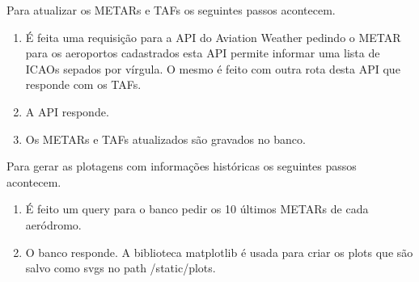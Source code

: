 Para atualizar os METARs e TAFs os seguintes passos acontecem.

\begin{enumerate}
\item É feita uma requisição para a API do Aviation Weather pedindo o METAR para os aeroportos
cadastrados esta API permite informar uma lista de ICAOs sepados por vírgula.
O mesmo é feito com outra rota desta API que responde com os TAFs.
\item A API responde.
\item Os METARs e TAFs atualizados são gravados no banco.
\end{enumerate}

Para gerar as plotagens com informações históricas os seguintes passos acontecem.
\begin{enumerate}
    \item É feito um query para o banco pedir os 10 últimos METARs de cada aeródromo.
    \item O banco responde. A biblioteca matplotlib é usada para criar os plots que são salvo como svgs 
    no path /static/plots.
\end{enumerate}